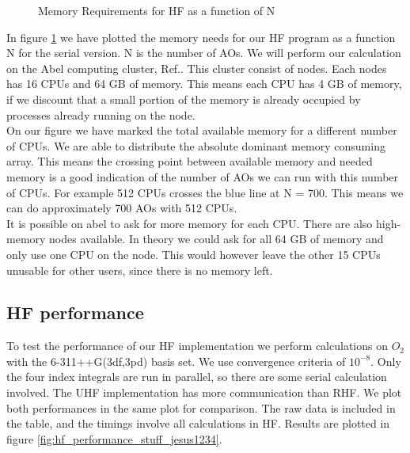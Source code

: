 \documentclass[a4paper,norsk,11pt,twoside]{report}
\begin{document}
\begin{figure}[h!]
\begin{center}
\caption{Memory Requirements for HF as a function of N}
\label{fig:memory_needs}
\end{center}
\end{figure}

In figure \ref{fig:memory_needs} we have plotted the memory needs for our HF program as a function N for the serial version. N is the number of AOs. We will perform our calculation on the Abel computing cluster, Ref.\cite{abel_po_g_citation1234567}. This cluster consist of nodes. Each nodes has 16 CPUs and 64 GB of memory. This means each CPU has 4 GB of memory, if we discount that a small portion of the memory is already occupied by processes already running on the node. \\

On our figure we have marked the total available memory for a different number of CPUs. We are able to distribute the absolute dominant memory consuming array. This means the crossing point between available memory and needed memory is a good indication of the number of AOs we can run with this number of CPUs. For example 512 CPUs crosses the blue line at N = 700. This means we can do approximately 700 AOs with 512 CPUs. \\

It is possible on abel to ask for more memory for each CPU. There are also high-memory nodes available. In theory we could ask for all 64 GB of memory and only use one CPU on the node. This would however leave the other 15 CPUs unusable for other users, since there is no memory left. 

\subsection{HF performance}
To test the performance of our HF implementation we perform calculations on $O_2$ with the 6-311++G(3df,3pd) basis set. We use convergence criteria of $10^{-8}$. Only the four index integrals are run in parallel, so there are some serial calculation involved. The UHF implementation has more communication than RHF. We plot both performances in the same plot for comparison. The raw data is included in the table, and the timings involve all calculations in HF. Results are plotted in figure \ref{fig:hf_performance_stuff_jesus1234}.
\end{document}
